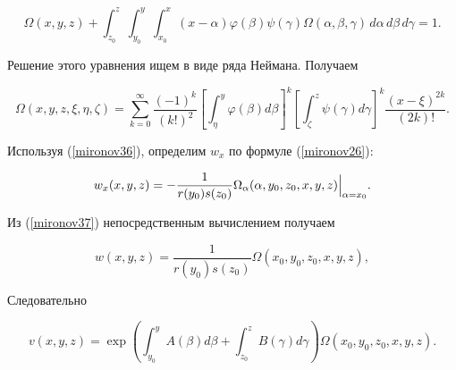 $$


\Omega(x, y, z)+\int_{z_{0}}^{z}\int_{y_{0}}^{y}\int_{x_{0}}^{x}


(x-\alpha)\varphi(\beta)\psi(\gamma)\Omega(\alpha,\beta,\gamma)\,


d\alpha \,d\beta \,d\gamma=1.


$$


Решение этого уравнения ищем в виде ряда Неймана. Получаем


\begin{equation}\label{mironov36}


\Omega(x, y, z,\xi, \eta, \zeta)=


\sum_{k=0}^{\infty}\frac{(-1)^{k}}{(k!)^2}


\left[ \int_{\eta}^{y} \varphi(\beta)d\beta \right]^{k}


\left[ \int_{\zeta}^{z} \psi(\gamma)d\gamma \right]^{k}


\frac{(x-\xi)^{2k}}{(2k)!}.


\end{equation}


Используя (\ref{mironov36}), определим $w_{x}$ по формуле (\ref{mironov26}):


\begin{equation}\label{mironov37}


w_{x}(x, y, z)=-\frac{1}{r(y_{0})s(z_{0})}


\Omega_{\alpha}(\alpha,y_{0}, z_{0}, x, y, z)\Bigl\vert_{\alpha=x_{0}}\Bigr. .


\end{equation}


Из (\ref{mironov37}) непосредственным вычислением получаем


\begin{equation*}%


w(x, y, z)=\frac{1}{r(y_{0})s(z_{0})}\Omega(x_{0}, y_{0}, z_{0}, x, y, z),


\end{equation*}


Следовательно


\begin{equation}\label{mironov39}


v(x, y, z)=\exp\left( \int_{y_{0}}^{y} A(\beta) d\beta


+\int_{z_{0}}^{z} B(\gamma) d\gamma\right)


\Omega (x_{0}, y_{0}, z_{0}, x, y, z).


\end{equation}





